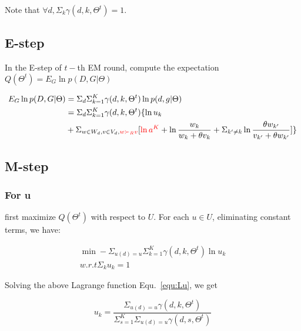 \documentclass{article}
\begin{document}
Note that $\forall d, \Sigma_k \gamma(d,k,\Theta^t)=1$.


\subsection{E-step}
 In the E-step of $t-$th  EM round, compute the expectation $Q(\Theta^t)=E_{G} \ln p(D,G|\Theta) $

\begin{align}\label{equ:estep}
E_{G} \ln p(D,G|\Theta) & =\Sigma_{d} \Sigma_{k=1}^K \gamma(d,k,\Theta^t) \ln p(d,g|\Theta)\\ \nonumber
& = \Sigma_d \Sigma_{k=1}^K \gamma(d,k,\Theta^t) \{ \ln u_k \\ \nonumber
&+ \Sigma_{w\in W_d, v\in V_d,\textcolor{red}{ w \succ_R v}} [\textcolor{red}{\ln a^K} + \ln \frac{w_k}{w_k +\theta v_k} +\Sigma_{k'\neq k} \ln \frac{\theta w_{k'}}{v_{k'}+\theta w_{k'}}]\}
\end{align}


\subsection{M-step}

\subsubsection{For u}
first maximize $Q(\Theta^t)$ with respect to $U$. For each $u \in U$, eliminating constant terms, we have:

\begin{align}\label{equ:Lu}
\min -\Sigma_{u(d)=u} \Sigma_{k=1}^K \gamma(d,k,\Theta^t) \ln u_k\\ \nonumber
w.r.t \Sigma_k u_k =1
\end{align}

Solving the above Lagrange function Equ.~\ref{equ:Lu}, we get

\begin{equation}\label{equ:u}
u_k =\frac{\Sigma_{u(d)=u}\gamma(d,k,\Theta^t)}{\Sigma_{s=1}^K \Sigma_{u(d)=u}\gamma(d,s,\Theta^t)}
\end{equation}
\end{document}
